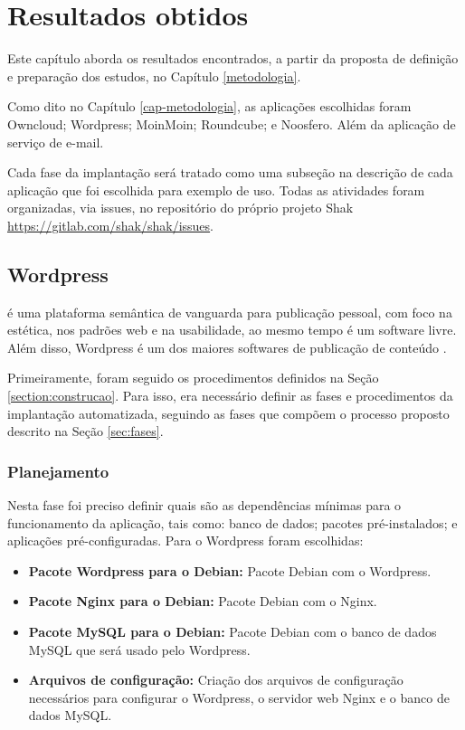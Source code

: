 \chapter{Resultados obtidos}
\label{cap-resultados}
Este capítulo aborda os resultados encontrados, a partir da proposta de
definição e preparação dos estudos, no Capítulo \ref{metodologia}.  

Como dito no Capítulo \ref{cap-metodologia}, as aplicações escolhidas foram 
Owncloud; Wordpress; MoinMoin; Roundcube; e Noosfero. Além da aplicação de serviço
de e-mail.
 
Cada fase da implantação será tratado como uma 
subseção na descrição de cada aplicação que foi escolhida para exemplo de uso. 
Todas as atividades foram organizadas,
via issues, no repositório do próprio projeto Shak 
\url{https://gitlab.com/shak/shak/issues}.

\section{Wordpress}
\label{sub:wordpress}

 é uma plataforma semântica de vanguarda para publicação pessoal, 
com foco na estética, nos padrões web e na usabilidade, ao mesmo tempo é 
um software livre. Além disso, Wordpress é um dos maiores softwares de 
publicação de conteúdo . 

Primeiramente, foram seguido os procedimentos definidos na Seção 
\ref{section:construcao}. Para isso, era
necessário definir as fases e procedimentos da implantação automatizada,
seguindo as fases que compõem o processo proposto descrito na Seção \ref{sec:fases}.

\subsection{Planejamento}

Nesta fase foi preciso definir quais são as dependências mínimas
para o funcionamento da aplicação, tais como: banco de dados; pacotes
pré-instalados; e aplicações pré-configuradas. Para o Wordpress foram escolhidas:

\begin{itemize}
   \item \textbf{Pacote Wordpress para o Debian:} Pacote Debian com o Wordpress.
   \item \textbf{Pacote Nginx para o Debian:} Pacote Debian com o Nginx.
   \item \textbf{Pacote MySQL para o Debian:} Pacote Debian com o banco de dados MySQL
   que será usado pelo Wordpress.
   \item \textbf{Arquivos de configuração:} Criação dos arquivos de configuração
   necessários para configurar o Wordpress, o servidor web Nginx e o banco de dados
   MySQL.
\end{itemize}

